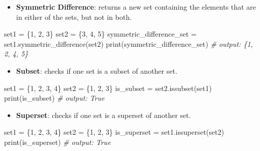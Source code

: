 \documentclass[11pt]{article}
\providecommand{\tightlist}{%
      \setlength{\itemsep}{0pt}\setlength{\parskip}{0pt}}
\newenvironment{Shaded}{}{}
\newcommand{\DecValTok}[1]{\textcolor[rgb]{0.25,0.63,0.44}{{#1}}}
\newcommand{\CommentTok}[1]{\textcolor[rgb]{0.38,0.63,0.69}{\textit{{#1}}}}
\newcommand{\NormalTok}[1]{{#1}}
\newcommand{\OperatorTok}[1]{\textcolor[rgb]{0.40,0.40,0.40}{{#1}}}
\newcommand{\BuiltInTok}[1]{{#1}}
\begin{document}
\begin{itemize}
\tightlist
\item
  \textbf{Symmetric Difference}: returns a new set containing the
  elements that are in either of the sets, but not in both.
\end{itemize}

\begin{Shaded}
\begin{Highlighting}[]
\NormalTok{set1 }\OperatorTok{=}\NormalTok{ \{}\DecValTok{1}\NormalTok{, }\DecValTok{2}\NormalTok{, }\DecValTok{3}\NormalTok{\}}
\NormalTok{set2 }\OperatorTok{=}\NormalTok{ \{}\DecValTok{3}\NormalTok{, }\DecValTok{4}\NormalTok{, }\DecValTok{5}\NormalTok{\}}
\NormalTok{symmetric\_difference\_set }\OperatorTok{=}\NormalTok{ set1.symmetric\_difference(set2)}
\BuiltInTok{print}\NormalTok{(symmetric\_difference\_set) }\CommentTok{\# output: \{1, 2, 4, 5\}}
\end{Highlighting}
\end{Shaded}

\begin{itemize}
\tightlist
\item
  \textbf{Subset}: checks if one set is a subset of another set.
\end{itemize}

\begin{Shaded}
\begin{Highlighting}[]
\NormalTok{set1 }\OperatorTok{=}\NormalTok{ \{}\DecValTok{1}\NormalTok{, }\DecValTok{2}\NormalTok{, }\DecValTok{3}\NormalTok{, }\DecValTok{4}\NormalTok{\}}
\NormalTok{set2 }\OperatorTok{=}\NormalTok{ \{}\DecValTok{1}\NormalTok{, }\DecValTok{2}\NormalTok{, }\DecValTok{3}\NormalTok{\}}
\NormalTok{is\_subset }\OperatorTok{=}\NormalTok{ set2.issubset(set1)}
\BuiltInTok{print}\NormalTok{(is\_subset) }\CommentTok{\# output: True}
\end{Highlighting}
\end{Shaded}

\begin{itemize}
\tightlist
\item
  \textbf{Superset}: checks if one set is a superset of another set.
\end{itemize}

\begin{Shaded}
\begin{Highlighting}[]
\NormalTok{set1 }\OperatorTok{=}\NormalTok{ \{}\DecValTok{1}\NormalTok{, }\DecValTok{2}\NormalTok{, }\DecValTok{3}\NormalTok{, }\DecValTok{4}\NormalTok{\}}
\NormalTok{set2 }\OperatorTok{=}\NormalTok{ \{}\DecValTok{1}\NormalTok{, }\DecValTok{2}\NormalTok{, }\DecValTok{3}\NormalTok{\}}
\NormalTok{is\_superset }\OperatorTok{=}\NormalTok{ set1.issuperset(set2)}
\BuiltInTok{print}\NormalTok{(is\_superset) }\CommentTok{\# output: True}
\end{Highlighting}
\end{Shaded}
\end{document}
